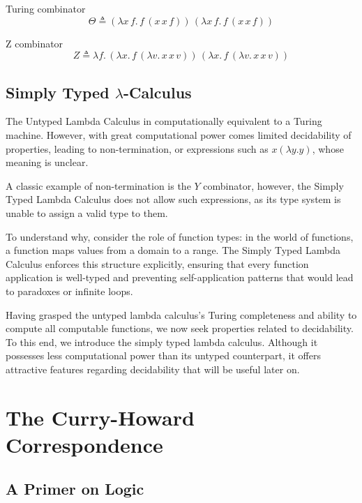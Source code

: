 \documentclass[12pt]{book}
\newcommand{\la}{\lambda}
\newcommand{\lCalc}{$\la$-Calculus}
\theoremstyle{plain}
\theoremstyle{definition}
\theoremstyle{definition}
\theoremstyle{definition}
\begin{document}
Turing combinator
\[
\Theta \triangleq 
(\lambda x\, f.\, f\, (x\, x\, f))\, (\lambda x\, f.\, f\, (x\, x\, f))
\]

Z combinator
\[
Z \triangleq \lambda f.\, 
  (\lambda x.\, f\, (\lambda v.\, x\, x\, v))\, 
  (\lambda x.\, f\, (\lambda v.\, x\, x\, v))
\]



\section{\centering Simply Typed \lCalc}

The Untyped Lambda Calculus in computationally equivalent to a  Turing machine. However, with great computational power comes limited decidability of properties, leading to non-termination, or expressions such as $x(\lambda y . y)$, whose meaning is unclear.

A classic example of non-termination is the $Y$ combinator, however, the Simply Typed Lambda Calculus does not allow such expressions, as its type system is unable to assign a valid type to them.

To understand why, consider the role of function types: in the world of functions, a function maps values from a domain to a range. The Simply Typed Lambda Calculus enforces this structure explicitly, ensuring that every function application is well-typed and preventing self-application patterns that would lead to paradoxes or infinite loops.

Having grasped the untyped lambda calculus's Turing completeness and ability to compute all computable functions, we now seek properties related to decidability. To this end, we introduce the simply typed lambda calculus. Although it possesses less computational power than its untyped counterpart, it offers attractive features regarding decidability that will be useful later on.


\chapter{The Curry-Howard Correspondence}


\section*{\centering A Primer on Logic}
\end{document}
